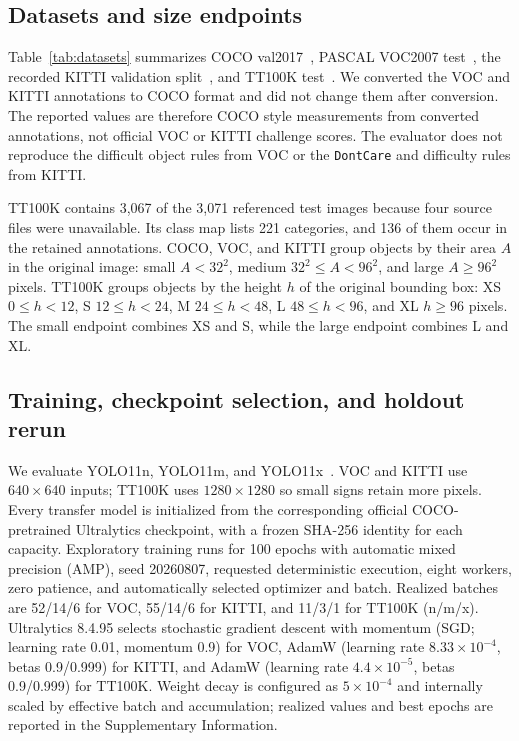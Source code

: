 \documentclass[a4paper,fleqn]{cas-dc}
\begin{document}
\subsection{Datasets and size endpoints}
\label{sec:datasets}

Table~\ref{tab:datasets} summarizes COCO val2017~\citep{lin2014coco}, PASCAL VOC2007 test~\citep{everingham2015voc}, the recorded KITTI validation split~\citep{geiger2012kitti}, and TT100K test~\citep{zhu2016tt100k}. We converted the VOC and KITTI annotations to COCO format and did not change them after conversion. The reported values are therefore COCO style measurements from converted annotations, not official VOC or KITTI challenge scores. The evaluator does not reproduce the difficult object rules from VOC or the \texttt{DontCare} and difficulty rules from KITTI.

\FloatBarrier
\begin{table}[t]
\centering
\caption{Frozen evaluation datasets. Counts refer to the converted annotations consumed by the evaluator.}
\label{tab:datasets}
\resizebox{\textwidth}{!}{}
\end{table}
\FloatBarrier

TT100K contains 3,067 of the 3,071 referenced test images because four source files were unavailable. Its class map lists 221 categories, and 136 of them occur in the retained annotations. COCO, VOC, and KITTI group objects by their area $A$ in the original image: small $A<32^2$, medium $32^2\leq A<96^2$, and large $A\geq96^2$ pixels. TT100K groups objects by the height $h$ of the original bounding box: XS $0\leq h<12$, S $12\leq h<24$, M $24\leq h<48$, L $48\leq h<96$, and XL $h\geq96$ pixels. The small endpoint combines XS and S, while the large endpoint combines L and XL.

\subsection{Training, checkpoint selection, and holdout rerun}
\label{sec:training}

We evaluate YOLO11n, YOLO11m, and YOLO11x~\citep{jocher2024yolo11}. VOC and KITTI use $640\times640$ inputs; TT100K uses $1280\times1280$ so small signs retain more pixels. Every transfer model is initialized from the corresponding official COCO-pretrained Ultralytics checkpoint, with a frozen SHA-256 identity for each capacity. Exploratory training runs for 100 epochs with automatic mixed precision (AMP), seed 20260807, requested deterministic execution, eight workers, zero patience, and automatically selected optimizer and batch. Realized batches are 52/14/6 for VOC, 55/14/6 for KITTI, and 11/3/1 for TT100K (n/m/x). Ultralytics 8.4.95 selects stochastic gradient descent with momentum (SGD; learning rate 0.01, momentum 0.9) for VOC, AdamW (learning rate $8.33\times10^{-4}$, betas 0.9/0.999) for KITTI, and AdamW (learning rate $4.4\times10^{-5}$, betas 0.9/0.999) for TT100K. Weight decay is configured as $5\times10^{-4}$ and internally scaled by effective batch and accumulation; realized values and best epochs are reported in the Supplementary Information.
\end{document}
